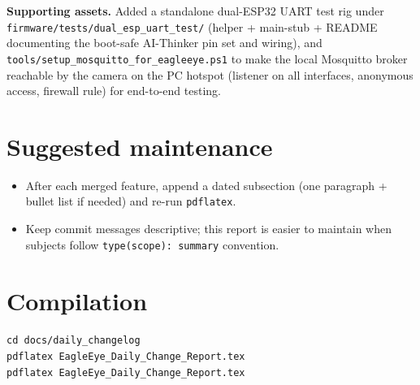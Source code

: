 \documentclass[11pt,a4paper]{article}
\begin{document}
\textbf{Supporting assets.} Added a standalone dual-ESP32 UART test rig under \texttt{firmware/tests/dual\_esp\_uart\_test/} (helper + main-stub + README documenting the boot-safe AI-Thinker pin set and wiring), and \texttt{tools/setup\_mosquitto\_for\_eagleeye.ps1} to make the local Mosquitto broker reachable by the camera on the PC hotspot (listener on all interfaces, anonymous access, firewall rule) for end-to-end testing.

\section{Suggested maintenance}
\begin{itemize}[nosep]
  \item After each merged feature, append a dated subsection (one paragraph + bullet list if needed) and re-run \texttt{pdflatex}.
  \item Keep commit messages descriptive; this report is easier to maintain when subjects follow \texttt{type(scope): summary} convention.
\end{itemize}

\section{Compilation}
\texttt{cd docs/daily\_changelog} \\
\texttt{pdflatex EagleEye\_Daily\_Change\_Report.tex} \\
\texttt{pdflatex EagleEye\_Daily\_Change\_Report.tex}
\end{document}
